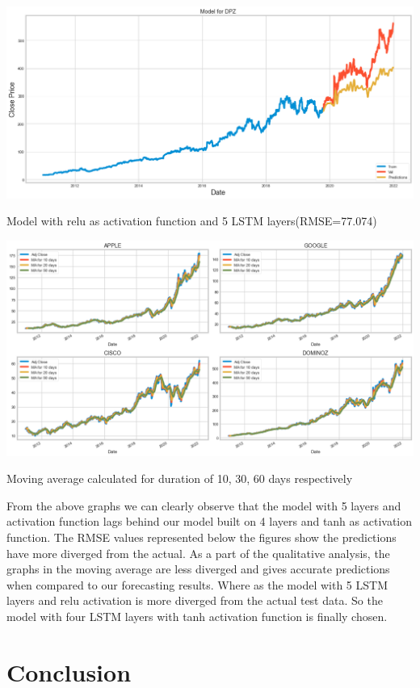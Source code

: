 \begin{center}
    \includegraphics[width=\textwidth]{DPZ_results_02.png}
    \caption{Model with relu as activation function and 5 LSTM layers(RMSE=77.074)}
\end{center}

\begin{center}
    \includegraphics[width=\textwidth]{backtest_plot.png}
    \caption{Moving average calculated for duration of 10, 30, 60 days respectively}
\end{center}

From the above graphs we can clearly observe that the model with 5 layers and activation function lags behind our model built on 4 layers and tanh as activation function. The RMSE values represented below the figures show the predictions have more diverged from the actual. As a part of the qualitative analysis, the graphs in the moving average are less diverged and gives accurate predictions when compared to our forecasting results. Where as the model with 5 LSTM layers and relu activation is more diverged from the actual test data. So the model with four LSTM layers with tanh activation function is finally chosen.

\section{Conclusion}


